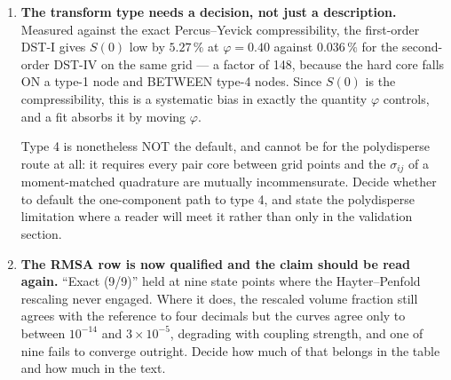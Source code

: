 \documentclass[11pt,a4paper]{article}
\begin{document}
\begin{enumerate}
That this fit POSTDATES the defects listed below matters, since each
affected every fit made before it was corrected: the rank-revealing
linear solve returning zeros at a condition number of $10^{20}$, a fit-flag
reset that silently left only one parameter free, and a Gaussian resolution
kernel used where $\mathrm{d}Q/Q$ reached $0.55$.

\item \textbf{The transform type needs a decision, not just a
description.} Measured against the exact Percus--Yevick compressibility, the
first-order DST-I gives $S(0)$ low by $5.27\,\%$ at $\varphi = 0.40$ against
$0.036\,\%$ for the second-order DST-IV on the same grid --- a factor of 148,
because the hard core falls ON a type-1 node and BETWEEN type-4 nodes. Since
$S(0)$ is the compressibility, this is a systematic bias in exactly the
quantity $\varphi$ controls, and a fit absorbs it by moving $\varphi$.

Type 4 is nonetheless NOT the default, and cannot be for the polydisperse
route at all: it requires every pair core between grid points and the
$\sigma_{ij}$ of a moment-matched quadrature are mutually incommensurate.
Decide whether to default the one-component path to type 4, and state the
polydisperse limitation where a reader will meet it rather than only in the
validation section.

\item \textbf{The RMSA row is now qualified and the claim should be read
again.} ``Exact (9/9)'' held at nine state points where the Hayter--Penfold
rescaling never engaged. Where it does, the rescaled volume fraction still
agrees with the reference to four decimals but the curves agree only to
between $10^{-14}$ and $3\times10^{-5}$, degrading with coupling strength,
and one of nine fails to converge outright. Decide how much of that belongs
in the table and how much in the text.


\end{enumerate}
\end{document}
